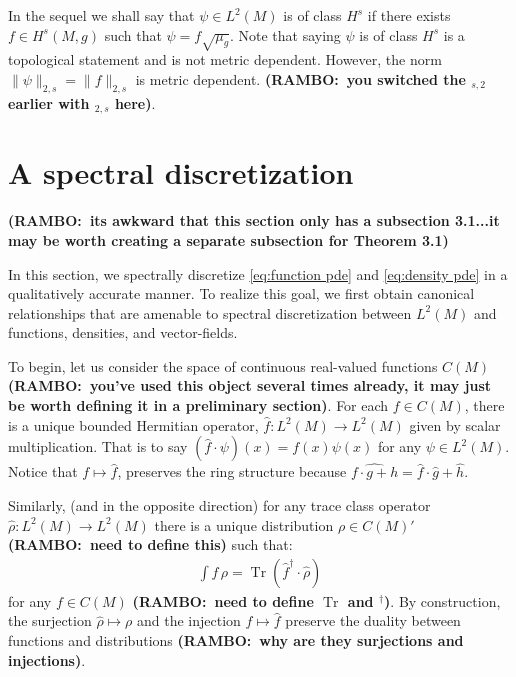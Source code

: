 \documentclass[final,leqno]{siamltex1213}
\newcommand{\ram}[1]{{\normalsize{\textbf{({\color{red}RAMBO:\ }#1)}}}}
\newcommand{\pder}[2]{\ensuremath{\frac{ \partial #1}{\partial #2}}}
\DeclareMathOperator{\Tr}{Tr}
\begin{document}
In the sequel we shall say that $\psi \in L^2(M)$ is of class $H^s$ if there exists $f \in H^s(M,g)$ such that $\psi = f \sqrt{\mu_g}$.
Note that saying $\psi$ is of class $H^{s}$ is a topological statement and is not metric dependent.
However, the norm $\| \psi \|_{2,s} = \| f \|_{2,s}$ is metric dependent. \ram{you switched the $_{s,2}$ earlier with $_{2,s}$ here}.

\section{A spectral discretization}
\ram{its awkward that this section only has a subsection 3.1...it may be worth creating a separate subsection for Theorem 3.1}

In this section, we spectrally discretize \eqref{eq:function pde} and \eqref{eq:density pde} in a qualitatively accurate manner.
To realize this goal, we first obtain canonical relationships that are amenable to spectral discretization between $L^{2}(M)$ and functions, densities, and vector-fields.

To begin, let us consider the space of continuous real-valued functions $C(M)$ \ram{you've used this object several times already, it may just be worth defining it in a preliminary section}.
For each $f \in C(M)$, there is a unique bounded Hermitian operator, $\hat{f} : L^{2}(M) \to L^{2}(M)$ given by scalar multiplication.
That is to say $(\hat{f} \cdot \psi) (x) = f(x) \psi(x)$ for any $\psi \in L^{2}(M)$.
Notice that $f \mapsto \hat{f}$, preserves the ring structure because $\widehat{f \cdot g + h} = \hat{f} \cdot \hat{g} + \hat{h}$.

Similarly, (and in the opposite direction) for any trace class operator $\hat{\rho}:L^{2}(M) \to L^{2}(M)$ there is a unique distribution $\rho \in C(M)'$ \ram{need to define this} such that: 
\begin{align}
	 \int f \, \rho = \Tr ( \hat{f}^{\dagger} \cdot \hat{\rho} )
\end{align}
for any $f \in C(M)$ \ram{need to define $\Tr$ and $^{\dagger}$}.
By construction, the surjection $\hat{\rho} \mapsto \rho$ and the injection $f \mapsto \hat{f}$ preserve the duality between functions and distributions \ram{why are they surjections and injections}.

\end{document}
